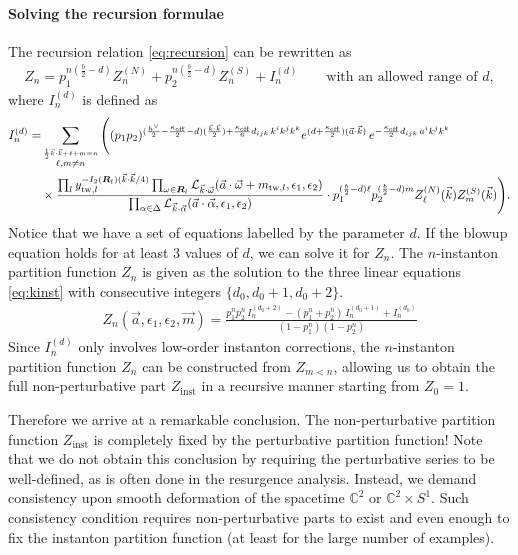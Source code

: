 \documentclass[letterpaper, 11pt]{article}
\newcommand{\nn}{\nonumber}
\def\IC{\mathbb{C}}
\def\CL{{\cal L}}
\def\a{\alpha}
\def\e{\epsilon}
\def\k{\kappa}
\def\w{\omega}
\def\D{\Delta}
\begin{document}
\paragraph{Solving the recursion formulae}
The recursion relation \eqref{eq:recursion} can be rewritten as 
\begin{align}
  \label{eq:kinst}
  Z_n = p_1^{n(\frac{b}{2}-d)}Z^{(N)}_{n}  + p_2^{n(\frac{b}{2}-d)}  Z^{(S)}_n  + I_n^{(d)} \qquad \text{with an allowed range of $d$},
\end{align}
where $I_{n}^{(d)}$ is defined as
\begin{align} \label{eq:Ind}
  I_{n}^{(d)} = &\sum_{\stackrel{\frac{1}{2}\vec{k}\cdot\vec{k} + \ell + m = n}{\ell, m \neq n}}  
  \Bigg( (p_1p_2)^{(\frac{h^\vee}{2} - \frac{\kappa_\text{eff}}{2}-d) (\frac{\vec{k}\cdot\vec{k}}{2}) +\frac{\k_\text{eff}}{6}d_{ijk}\,k^ik^jk^k} e^{(d+\frac{\k_\text{eff}}{2})(\vec{a}\cdot\vec{k})}\,
 e^{-\frac{\k_\text{eff}}{2}d_{ijk}\,a^ik^jk^k}  \\& 
 \times    \frac{\prod_{l} y_{\text{tw}, l}^{-I_2(\boldsymbol{R}_l)(\vec{k}\cdot\vec{k}/4)} \prod_{\w \in \boldsymbol{R}_l} \CL_{\vec{k}\cdot\vec{\w}}(\vec{a}\cdot \vec{\w} + m_{\text{tw},l}, \e_1,\e_2)}{ \prod_{\a \in \D} \CL_{\vec{k} \cdot \vec{\a}} (\vec{a}\cdot\vec{\alpha}, \epsilon_1, \epsilon_2)}
 \cdot p_1^{(\frac{b}{2}-d)\ell}p_2^{(\frac{b}{2}-d)m} Z^{(N)}_{\ell}(\vec{k})  Z^{(S)}_m (\vec{k}) \Bigg) . \nn
\end{align}
Notice that we have a set of equations labelled by the parameter $d$. If the blowup equation holds for at least 3 values of $d$, we can solve it for $Z_n$. 
The $n$-instanton partition function $Z_n$ is given as the solution to the three linear equations \eqref{eq:kinst} with consecutive integers $\{d_0, d_0+1, d_0+2\}$.
\begin{align}
  Z_n(\vec{a},\e_1,\e_2, \vec{m})=\frac{p_1^n p_2^n \,I_{n}^{(d_0+2)}-(p_1^n+p_2^n)\,I_{n}^{(d_0+1)}+I_{n}^{(d_0)}}{(1-p_1^n)(1-p_2^n)}
\end{align}
Since $I_n^{(d)}$ only involves low-order instanton corrections, the $n$-instanton partition function $Z_n$ can be constructed from $Z_{m<n}$, allowing us to obtain the full non-perturbative part $Z_\text{inst}$ in a recursive manner starting from $Z_0 = 1$. 

Therefore we arrive at a remarkable conclusion. The non-perturbative partition function $Z_\text{inst}$ is completely fixed by the perturbative partition function! Note that we do not obtain this conclusion by requiring the perturbative series to be well-defined, as is often done in the resurgence analysis. Instead, we demand consistency upon smooth deformation of the spacetime $\IC^2$ or $\IC^2 \times S^1$. Such consistency condition requires non-perturbative parts to exist and even enough to fix the instanton partition function (at least for the large number of examples). 
\end{document}

